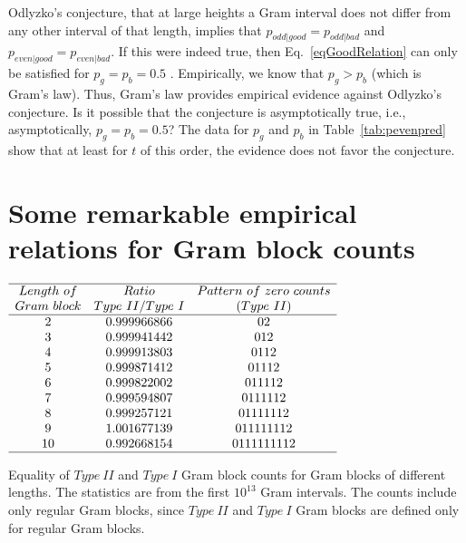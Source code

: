 \documentclass[twoside]{article}
\theoremstyle{definition}
\begin{document}
Odlyzko's conjecture,  that at large heights a Gram interval does not differ from any other interval of that length, implies that $p_{odd|good} = p_{odd|bad}$ and  $p_{even|good} = p_{even|bad}$. If this were indeed true, then Eq.~\ref{eqGoodRelation} can only be satisfied for $p_g = p_b = 0.5$ . Empirically, we know that $p_g > p_b$ (which is Gram's law). Thus, Gram's law provides empirical evidence against Odlyzko's conjecture. 
Is it possible that the conjecture is asymptotically true, i.e., asymptotically, $p_g = p_b = 0.5$? The data for  $p_g$ and $p_b$ in Table~\ref{tab:pevenpred}  show that at least for $t$ of this order,  the  evidence does not favor the conjecture. 

\section{\label{sec6}Some remarkable empirical relations for Gram block counts}

\begin{table}
\centering \(\begin{array}{ccc}
\hline
Length~of & Ratio&Pattern~of~zero~counts  \\
Gram~block& Type~II/Type~I&(Type~II) \\
\hline
2& 0.999966866&02\\
3& 0.999941442&012\\
4& 0.999913803&0112\\
5& 0.999871412&01112\\
6& 0.999822002&011112\\
7& 0.999594807&0111112\\
8& 0.999257121&01111112\\
9& 1.001677139&011111112\\
10& 0.992668154&0111111112\\
\hline
\end{array}\)
\caption{Equality of $Type~II$ and $Type~I$ Gram block counts for Gram blocks of different lengths. The statistics are from the first $10^{13}$ Gram intervals. The counts include only regular Gram blocks, since $Type~II$ and $Type~I$ Gram blocks are defined only for regular Gram blocks.} \label{tab:rosser}
\end{table}
\end{document}
